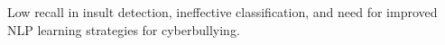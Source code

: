 Low recall in insult detection, ineffective classification, and need for improved NLP learning strategies for cyberbullying.